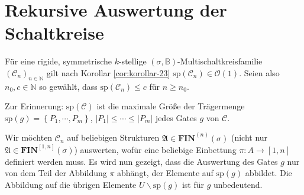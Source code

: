 \section{Rekursive Auswertung der Schaltkreise}

Für eine rigide, symmetrische $k$-stellige $\left(\sigma,\mathbb{B}\right)$-Multischaltkreisfamilie
$\left(\mathcal{C}_{n}\right)_{n\in\mathbb{N}}$ gilt nach Korollar
\ref{cor:korollar-23} $\mathrm{sp}\left(\mathcal{C}_{n}\right)\in\mathcal{O}\left(1\right)$.
Seien also $n_{0},c\in\mathbb{N}$ so gewählt, dass $\mathrm{sp}\left(\mathcal{C}_{n}\right)\leqslant c$
für $n\geqslant n_{0}$.

Zur Erinnerung: $\mathrm{sp}\left(\mathcal{C}\right)$ ist die maximale
Größe der Trägermenge $\mathrm{sp}\left(g\right)=\left\{ P_{1},\cdots,P_{m}\right\} $,
$\left|P_{1}\right|\leqslant\cdots\leqslant\left|P_{m}\right|$ jedes
Gates $g$ von $\mathcal{C}$.

Wir möchten $\mathcal{C}_{n}$ auf beliebigen Strukturen $\mathfrak{A}\in\mathbf{FIN}^{\left(n\right)}\left(\sigma\right)$
(nicht nur $\mathfrak{A}\in\mathbf{FIN}^{\left[1,n\right]}\left(\sigma\right)$)
auswerten, wofür eine beliebige Einbettung $\pi:A\rightarrow\left[1,n\right]$
definiert werden muss. Es wird nun gezeigt, dass die Auswertung des
Gates $g$ nur von dem Teil der Abbildung $\pi$ abhängt, der Elemente
auf $\mathrm{sp}\left(g\right)$ abbildet. Die Abbildung auf die übrigen
Elemente $U\backslash\mathrm{sp}\left(g\right)$ ist für $g$ unbedeutend.


